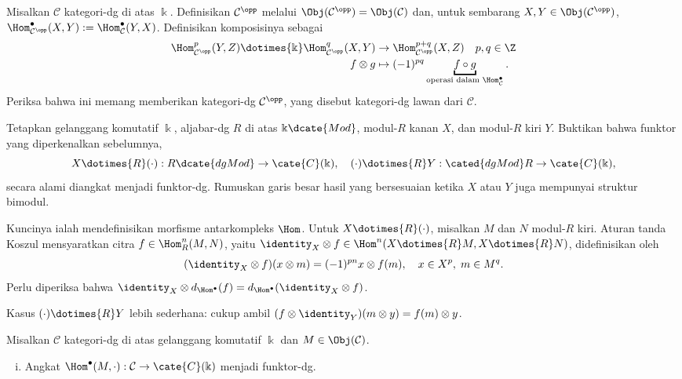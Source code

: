 \begin{Exercises}
	\item Misalkan $\mathcal{C}$ kategori-dg di atas $\Bbbk$. Definisikan
	$\mathcal{C}^{\opp}$ melalui
	$\Obj(\mathcal{C}^{\opp})=\Obj(\mathcal{C})$ dan, untuk sembarang
	$X,Y\in\Obj(\mathcal{C}^{\opp})$,
	$\Hom^\bullet_{\mathcal{C}^{\opp}}(X,Y):=
	\Hom^\bullet_{\mathcal{C}}(Y,X)$. Definisikan komposisinya sebagai
	\begin{align*}
		\Hom^p_{\mathcal{C}^{\opp}}(Y, Z) \dotimes{\Bbbk} \Hom^q_{\mathcal{C}^{\opp}}(X, Y) & \to \Hom^{p+q}_{\mathcal{C}^{\opp}}(X, Z) \quad p, q \in \Z \\
		f \otimes g & \mapsto (-1)^{pq} \underbracket{f \circ g}_{\text{operasi dalam }\Hom^\bullet_{\mathcal{C}}}.
	\end{align*}
	Periksa bahwa ini memang memberikan kategori-dg $\mathcal{C}^{\opp}$,
	yang disebut kategori-dg lawan dari $\mathcal{C}$.

	\item Tetapkan gelanggang komutatif $\Bbbk$, aljabar-dg $R$ di atas
	$\Bbbk\dcate{Mod}$, modul-$R$ kanan $X$, dan modul-$R$ kiri $Y$. Buktikan
	bahwa funktor yang diperkenalkan sebelumnya,
	\[ X \dotimes{R} (\cdot): R\dcate{dgMod} \to \cate{C}(\Bbbk), \quad (\cdot) \dotimes{R} Y: \cated{dgMod}R \to \cate{C}(\Bbbk), \]
	secara alami diangkat menjadi funktor-dg. Rumuskan garis besar hasil yang bersesuaian
	ketika $X$ atau $Y$ juga mempunyai struktur bimodul.

	\begin{hint}
		Kuncinya ialah mendefinisikan morfisme antarkompleks $\Hom$. Untuk
		$X\dotimes{R}(\mathord\cdot)$, misalkan $M$ dan $N$ modul-$R$ kiri.
		Aturan tanda Koszul mensyaratkan citra
		$f\in\Hom^n_R(M,N)$, yaitu
		$\identity_X\otimes f\in
		\Hom^n(X\dotimes{R}M,X\dotimes{R}N)$, didefinisikan oleh
		\[ (\identity_X \otimes f)(x \otimes m) = (-1)^{pn} x \otimes f(m), \quad x \in X^p, \; m \in M^q. \]
		Perlu diperiksa bahwa
		$\identity_X\otimes d_{\Hom^\bullet}(f)=
		d_{\Hom^\bullet}(\identity_X\otimes f)$.

		Kasus $(\mathord\cdot)\dotimes{R}Y$ lebih sederhana: cukup ambil
		$(f\otimes\identity_Y)(m\otimes y)=f(m)\otimes y$.
	\end{hint}

	\item Misalkan $\mathcal{C}$ kategori-dg di atas gelanggang komutatif
	$\Bbbk$ dan $M\in\Obj(\mathcal{C})$.
	\begin{enumerate}[(i)]
		\item Angkat
		$\Hom^\bullet(M,\mathord\cdot):\mathcal{C}\to\cate{C}(\Bbbk)$ menjadi
		funktor-dg.


\end{enumerate}
\end{Exercises}
